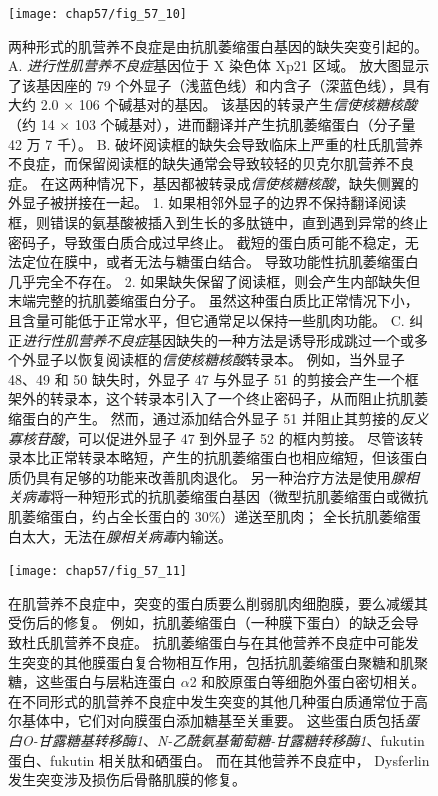\begin{figure}[htbp]
	\centering
	\texttt{[image: chap57/fig\_57\_10]}
	\caption{两种形式的肌营养不良症是由抗肌萎缩蛋白基因的缺失突变引起的\cite{hoffman1987dystrophin}。
		A. \textit{进行性肌营养不良症}基因位于 X 染色体 Xp21 区域。
		放大图显示了该基因座的 79 个外显子（浅蓝色线）和内含子（深蓝色线），具有大约 2.0 × 106 个碱基对的基因。
		该基因的转录产生\textit{信使核糖核酸}（约 14 × 103 个碱基对），进而翻译并产生抗肌萎缩蛋白（分子量 42 万 7 千）。
		B. 破坏阅读框的缺失会导致临床上严重的杜氏肌营养不良症，而保留阅读框的缺失通常会导致较轻的贝克尔肌营养不良症。
		在这两种情况下，基因都被转录成\textit{信使核糖核酸}，缺失侧翼的外显子被拼接在一起。
		1. 如果相邻外显子的边界不保持翻译阅读框，则错误的氨基酸被插入到生长的多肽链中，直到遇到异常的终止密码子，导致蛋白质合成过早终止。
		截短的蛋白质可能不稳定，无法定位在膜中，或者无法与糖蛋白结合。
		导致功能性抗肌萎缩蛋白几乎完全不存在。
		2. 如果缺失保留了阅读框，则会产生内部缺失但末端完整的抗肌萎缩蛋白分子。
		虽然这种蛋白质比正常情况下小，且含量可能低于正常水平，但它通常足以保持一些肌肉功能。
		C. 纠正\textit{进行性肌营养不良症}基因缺失的一种方法是诱导形成跳过一个或多个外显子以恢复阅读框的\textit{信使核糖核酸}转录本。
		例如，当外显子 48、49 和 50 缺失时，外显子 47 与外显子 51 的剪接会产生一个框架外的转录本，这个转录本引入了一个终止密码子，从而阻止抗肌萎缩蛋白的产生。
		然而，通过添加结合外显子 51 并阻止其剪接的\textit{反义寡核苷酸}，可以促进外显子 47 到外显子 52 的框内剪接。
		尽管该转录本比正常转录本略短，产生的抗肌萎缩蛋白也相应缩短，但该蛋白质仍具有足够的功能来改善肌肉退化。
		另一种治疗方法是使用\textit{腺相关病毒}将一种短形式的抗肌萎缩蛋白基因（微型抗肌萎缩蛋白或微抗肌萎缩蛋白，约占全长蛋白的 30\%）递送至肌肉；
		全长抗肌萎缩蛋白太大，无法在\textit{腺相关病毒}内输送。}
	\label{fig:57_10}
\end{figure}


\begin{figure}[htbp]
	\centering
	\texttt{[image: chap57/fig\_57\_11]}
	\caption{在肌营养不良症中，突变的蛋白质要么削弱肌肉细胞膜，要么减缓其受伤后的修复。
		例如，抗肌萎缩蛋白（一种膜下蛋白）的缺乏会导致杜氏肌营养不良症。
		抗肌萎缩蛋白与在其他营养不良症中可能发生突变的其他膜蛋白复合物相互作用，包括抗肌萎缩蛋白聚糖和肌聚糖，这些蛋白与层粘连蛋白 $\alpha$2 和胶原蛋白等细胞外蛋白密切相关。
		在不同形式的肌营养不良症中发生突变的其他几种蛋白质通常位于高尔基体中，它们对向膜蛋白添加糖基至关重要。
		这些蛋白质包括\textit{蛋白O-甘露糖基转移酶1}、\textit{N-乙酰氨基葡萄糖-甘露糖转移酶1}、fukutin蛋白、fukutin 相关肽和硒蛋白。
		而在其他营养不良症中， Dysferlin发生突变涉及损伤后骨骼肌膜的修复\cite{brown2005harrison}。}
	\label{fig:57_11}
\end{figure}



